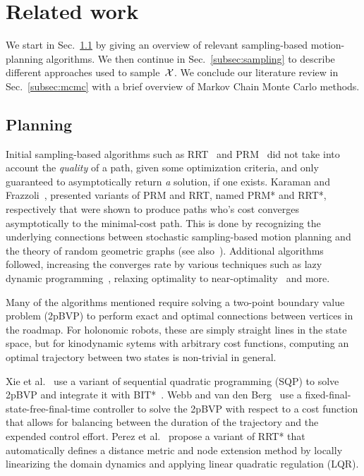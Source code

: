 \documentclass[letterpaper, 10 pt, conference]{ieeeconf}  %
\begin{document}


\section{Related work}
\label{sec:related_work}
We start in Sec.~\ref{subsec:planning} by giving an overview of relevant sampling-based motion-planning algorithms.
We then continue in Sec.~\ref{subsec:sampling} to describe different approaches used to sample~$\mathcal{X}$.
We conclude our literature review in Sec.~\ref{subsec:mcmc} with a brief overview of Markov Chain Monte Carlo methods.

\subsection{Planning}
\label{subsec:planning}
Initial sampling-based algorithms such as RRT~\cite{LK01} and PRM~\cite{KSLO96} did not take into account the \emph{quality} of a path, given some optimization criteria, and only guaranteed to asymptotically return \emph{a} solution, if one exists.
Karaman and Frazzoli~\cite{KF11}, presented variants of PRM and RRT, named PRM* and RRT*, respectively that were shown to produce paths who's cost converges asymptotically to the minimal-cost path.
This is done by recognizing the underlying connections between stochastic sampling-based motion planning and the theory of random geometric graphs (see also~\cite{SSH16}).
Additional algorithms followed, increasing the converges rate by various techniques such as lazy dynamic programming~\cite{GSB15, JSCP15}, relaxing optimality to near-optimality~\cite{DB14, SH16} and more.


Many of the algorithms mentioned require solving a two-point boundary value problem (2pBVP) to perform exact and optimal connections between vertices in the roadmap.
For holonomic robots, these are simply straight lines in the state space, but for kinodynamic sytems with arbitrary cost functions,  computing an optimal trajectory between two states is non-trivial in general.

Xie et al.~\cite{XBPA15} use a variant of sequential quadratic programming (SQP) to solve 2pBVP and integrate it with BIT*~\cite{GSB15}.
Webb and van den Berg~\cite{WB13} use a fixed-final-state-free-final-time controller to solve the 2pBVP  with respect to a cost function that allows for balancing between the duration of the trajectory and the expended control effort.
Perez et al.~\cite{PPKKL12} propose a variant of RRT* that automatically defines a distance metric and node extension method by locally linearizing
the domain dynamics and applying linear quadratic regulation (LQR).
\end{document}

